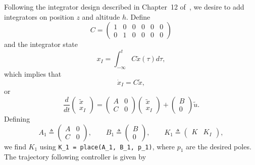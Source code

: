 \documentclass{article}
\begin{document}
Following the integrator design described in Chapter~12 of~\cite{BeardMcLainPeterson}, we desire to add integrators on position $z$ and altitude $h$.  Define
\[
C = \begin{pmatrix}
	1 & 0 & 0 & 0 & 0 & 0 \\
 	0 & 1 & 0 & 0 & 0 & 0
    \end{pmatrix}
\]
and the integrator state
\[
x_I = \int_{-\infty}^t C\tilde{x}(\tau)d\tau,
\]
which implies that
\[
\dot{x}_I = C\tilde{x},
\]
or 
\[
\frac{d}{dt}\begin{pmatrix}\tilde{x} \\ x_I \end{pmatrix} = \begin{pmatrix} A & 0 \\ C & 0 \end{pmatrix} \begin{pmatrix}\tilde{x} \\ x_I \end{pmatrix} + \begin{pmatrix} B \\ 0 \end{pmatrix}\tilde{u}.
\]
Defining
\[
A_1 \triangleq \begin{pmatrix} A & 0 \\ C & 0 \end{pmatrix}, 
\qquad
B_1 \triangleq \begin{pmatrix} B \\ 0 \end{pmatrix},
\qquad
K_1 \triangleq \begin{pmatrix} K & K_I \end{pmatrix},
\]
we find $K_1$ using {\tt K\_1 = place(A\_1, B\_1, p\_1)}, where $p_1$ are the desired poles.  The trajectory following controller is given by
\end{document}
